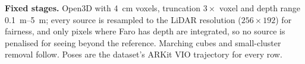 \textbf{Fixed stages.} Open3D  with \SI{4}{cm} voxels, truncation $3\times$ voxel and depth
range \SIrange{0.1}{5}{m}; every source is resampled to the LiDAR resolution ($256\times192$) for fairness, and only
pixels where Faro has depth are integrated, so no source is penalised for seeing beyond the reference. Marching cubes
and small-cluster removal follow. Poses are the dataset's ARKit VIO trajectory for every row.
